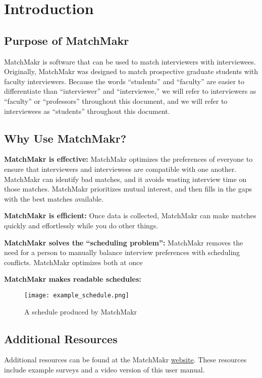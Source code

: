 

\chapter{Introduction}

\section{Purpose of MatchMakr}
MatchMakr is software that can be used to match interviewers with interviewees.  Originally, MatchMakr was designed to match prospective graduate students with faculty interviewers.  Because the words ``students'' and ``faculty'' are easier to differentiate than ``interviewer'' and ``interviewee,'' we will refer to interviewers as ``faculty'' or ``professors'' throughout this document, and we will refer to interviewees as ``students'' throughout this document.

\section{Why Use MatchMakr?}
\par
\textbf{MatchMakr is effective:} 
MatchMakr optimizes the preferences of everyone to ensure that interviewers and interviewees are compatible with one another.  MatchMakr can identify bad matches, and it avoids wasting interview time on those matches.  MatchMakr prioritizes mutual interest, and then fills in the gaps with the best matches available.

\par
\textbf{MatchMakr is efficient:}
Once data is collected, MatchMakr can make matches quickly and effortlessly while you do other things.

\par
\textbf{MatchMakr solves the ``scheduling problem'':}
MatchMakr removes the need for a person to manually balance interview preferences with scheduling conflicts.  MatchMakr optimizes both at once


\textbf{MatchMakr makes readable schedules:}
\begin{figure}[!h]
	\centering
	\texttt{[image: example\_schedule.png]}
	\caption{\label{fig:example_schedule} A schedule produced by MatchMakr}
\end{figure}

\section{Additional Resources}
Additional resources can be found at the MatchMakr \href{\website}{website}.  These resources include example surveys and a video version of this user manual.